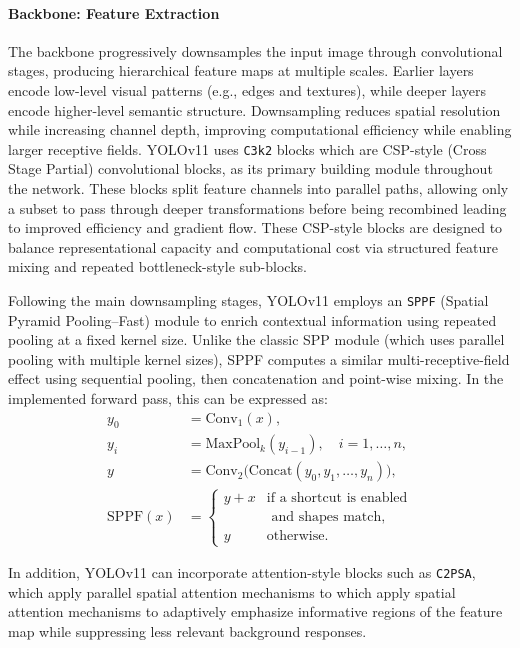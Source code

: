 \documentclass[conference]{IEEEtran}
\begin{document}
\paragraph{Backbone: Feature Extraction}
The backbone progressively downsamples the input image through convolutional stages, producing hierarchical feature maps at multiple scales. Earlier layers encode low-level visual patterns (e.g., edges and textures), while deeper layers encode higher-level semantic structure. Downsampling reduces spatial resolution while increasing channel depth, improving computational efficiency while enabling larger receptive fields. YOLOv11 uses \texttt{C3k2} blocks which are CSP-style (Cross Stage Partial) convolutional blocks, as its primary building module throughout the network. These blocks split feature channels into parallel paths, allowing only a subset to pass through deeper transformations before being recombined leading to improved efficiency and gradient flow. These CSP-style blocks are designed to balance representational capacity and computational cost via structured feature mixing and repeated bottleneck-style sub-blocks.

Following the main downsampling stages, YOLOv11 employs an \texttt{SPPF} (Spatial Pyramid Pooling--Fast) module to enrich contextual information using repeated pooling at a fixed kernel size. Unlike the classic SPP module (which uses parallel pooling with multiple kernel sizes), SPPF computes a similar multi-receptive-field effect using sequential pooling, then concatenation and point-wise mixing. In the implemented forward pass, this can be expressed as:
\begin{align}
y_0 &= \mathrm{Conv}_1(x), \\
y_i &= \mathrm{MaxPool}_k\!\left(y_{i-1}\right), \quad i = 1,\dots,n, \\
y   &= \mathrm{Conv}_2\!\Big(\mathrm{Concat}\!\left(y_0,y_1,\dots,y_n\right)\Big), \\
\mathrm{SPPF}(x) &=
\begin{cases}
y + x & \text{if a shortcut is enabled}\\
       & \text{ and shapes match},\\
y     & \text{otherwise}.
\end{cases}
\end{align}

In addition, YOLOv11 can incorporate attention-style blocks such as \texttt{C2PSA}, which apply parallel spatial attention mechanisms to which apply spatial attention mechanisms to adaptively emphasize informative regions of the feature map while suppressing less relevant background responses.
  
\end{document}
